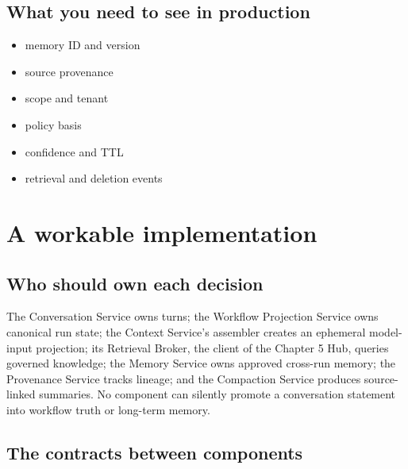 \subsection{What you need to see in production}

\begin{itemize}

\item memory ID and version

\item source provenance

\item scope and tenant

\item policy basis

\item confidence and TTL

\item retrieval and deletion events

\end{itemize}

\section{A workable implementation}

\subsection{Who should own each decision}

The Conversation Service owns turns; the Workflow Projection Service owns canonical run state; the Context Service's assembler creates an ephemeral model-input projection; its Retrieval Broker, the client of the Chapter 5 Hub, queries governed knowledge; the Memory Service owns approved cross-run memory; the Provenance Service tracks lineage; and the Compaction Service produces source-linked summaries. No component can silently promote a conversation statement into workflow truth or long-term memory.\par

\subsection{The contracts between components}

